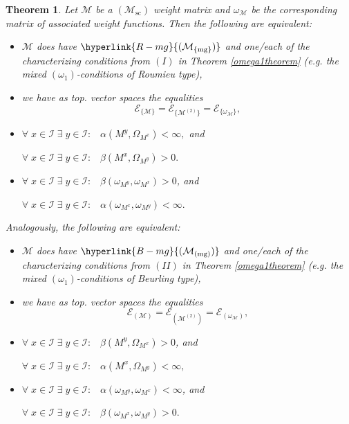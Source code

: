 \documentclass[10pt]{amsart}%
\numberwithin{equation}{section}
\theoremstyle{plain}
\newtheorem{theorem}[proposition]{Theorem}
\let\on=\operatorname
\begin{document}
\begin{theorem}\label{Thm32testfuncnew}
Let $\mathcal{M}$ be a \hyperlink{Msc}{$(\mathcal{M}_{\on{sc}})$} weight matrix and $\omega_{\mathcal{M}}$ be the corresponding matrix of associated weight functions. Then the following are equivalent:

\begin{itemize}
\item[$(i)$] $\mathcal{M}$ does have $\hyperlink{R-mg}{(\mathcal{M}_{\{\on{mg}\}})}$ and one/each of the characterizing conditions from $(I)$ in Theorem \ref{omega1theorem} (e.g. the mixed \hyperlink{om1}{$(\omega_1)$}-conditions of Roumieu type),

\item[$(ii)$] we have as top. vector spaces the equalities
$$\mathcal{E}_{\{\mathcal{M}\}}=\mathcal{E}_{\{\mathcal{M}^{(2)}\}}=\mathcal{E}_{\{\omega_{\mathcal{M}}\}},$$

\item[$(iii)$] $\forall\;x\in\mathcal{I}\;\exists\;y\in\mathcal{I}:\;\;\;\alpha(M^y,\Omega_{M^x}) <\infty,$ and\par
$\forall\;x\in\mathcal{I}\;\exists\;y\in\mathcal{I}:\;\;\; \beta(M^x,\Omega_{M^y})>0.$

\item[$(iv)$] $\forall\;x\in\mathcal{I}\;\exists\;y\in\mathcal{I}:\;\;\;\beta(\omega_{M^y},\omega_{M^x})>0$, and\par
$\forall\;x\in\mathcal{I}\;\exists\;y\in\mathcal{I}:\;\;\; \alpha(\omega_{M^x},\omega_{M^y})<\infty.$

\end{itemize}

Analogously, the following are equivalent:

\begin{itemize}
\item[$(i)$] $\mathcal{M}$ does have $\hyperlink{B-mg}{(\mathcal{M}_{(\on{mg})})}$ and one/each of the characterizing conditions from $(II)$ in Theorem \ref{omega1theorem} (e.g. the mixed \hyperlink{om1}{$(\omega_1)$}-conditions of Beurling type),

\item[$(ii)$] we have as top. vector spaces the equalities
$$\mathcal{E}_{(\mathcal{M})}=\mathcal{E}_{(\mathcal{M}^{(2)})}=\mathcal{E}_{(\omega_{\mathcal{M}})},$$

\item[$(iii)$] $\forall\;x\in\mathcal{I}\;\exists\;y\in\mathcal{I}:\;\;\; \beta(M^y,\Omega_{M^x})>0$, and\par
$\forall\;x\in\mathcal{I}\;\exists\;y\in\mathcal{I}:\;\;\;\alpha(M^x,\Omega_{M^y}) <\infty,$

\item[$(iv)$]
$\forall\;x\in\mathcal{I}\;\exists\;y\in\mathcal{I}:\;\;\; \alpha(\omega_{M^y},\omega_{M^x})<\infty$, and\par
$\forall\;x\in\mathcal{I}\;\exists\;y\in\mathcal{I}:\;\;\;\beta(\omega_{M^x},\omega_{M^y})>0.$

\end{itemize}
\end{theorem}
\end{document}
